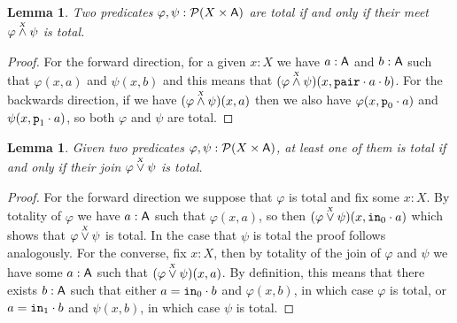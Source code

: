 \documentclass[11pt]{article}
\newtheorem{lemm}[thrm]{Lemma}
\begin{document}
\begin{lemm}\label{lemm:meet-total}
  Two predicates \(\varphi,\psi : \mathcal{P}{({X}\times{\ensuremath{\mathsf{A}}})}\) are total if and only if their
  meet \({\varphi}\overset{\scriptscriptstyle X}{\land}{\psi}\) is total.
\end{lemm}
\begin{proof}
  For the forward direction, for a given \(x:X\) we have \(a:\mathsf{A}\) and \(b:\mathsf{A}\)
  such that \(\varphi(x,a)\) and \(\psi(x,b)\) and this means that
  \(({\varphi}\overset{\scriptscriptstyle X}{\land}{\psi})(x,{{\texttt{pair}}\cdot{a}}\cdot{b})\).
  For the backwards direction, if we have \(({\varphi}\overset{\scriptscriptstyle X}{\land}{\psi})(x,a)\)
  then we also have \(\varphi(x,{\texttt{p}_0}\cdot{a})\) and
  \(\psi(x,{\texttt{p}_1}\cdot{a})\), so both \(\varphi\) and \(\psi\) are total.
\end{proof}

\begin{lemm}\label{lemm:join-total}
  Given two predicates \(\varphi,\psi : \mathcal{P}{({X}\times{\ensuremath{\mathsf{A}}})}\), at least one of them is
  total if and only if their join \({\varphi}\overset{\scriptscriptstyle X}{\lor}{\psi}\) is total.
\end{lemm}
\begin{proof}
  For the forward direction we suppose that \(\varphi\) is total
  and fix some \(x:X\).
  By totality of \(\varphi\) we have \(a:\mathsf{A}\) such that
  \(\varphi(x,a)\), so then \(({\varphi}\overset{\scriptscriptstyle X}{\lor}{\psi})(x,{\texttt{in}_0}\cdot{a})\)
  which shows that \({\varphi}\overset{\scriptscriptstyle X}{\lor}{\psi}\) is total.
  In the case that \(\psi\) is total the proof follows analogously.
  For the converse, fix \(x : X\), then by totality of the join
  of \(\varphi\) and \(\psi\) we have some \(a:\mathsf{A}\) such that
  \(({\varphi}\overset{\scriptscriptstyle X}{\lor}{\psi})(x,a)\).
  By definition, this means that there exists \(b:\mathsf{A}\) such that either
  \(a = {\texttt{in}_0}\cdot{b}\) and \(\varphi(x,b)\), in which case \(\varphi\) is
  total, or \(a = {\texttt{in}_1}\cdot{b}\) and \(\psi(x,b)\), in which case
  \(\psi\) is total.
\end{proof}
\end{document}
